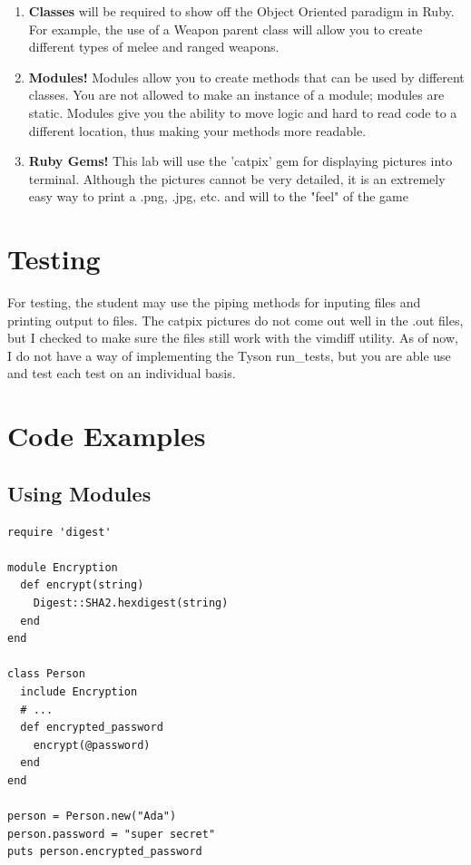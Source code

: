 \documentclass{article}
\begin{document}
\begin{enumerate}

\item \textbf{Classes} will be required to show off the Object Oriented paradigm in Ruby. For example, the use of a Weapon parent class will allow you to create different types of melee and ranged weapons. 

\item \textbf{Modules!} Modules allow you to create methods that can be used by different classes. You are not allowed to make an instance of a module; modules are static. Modules give you the ability to move logic and hard to read code to a different location, thus making your methods more readable.

\item \textbf{Ruby Gems!} This lab will use the 'catpix' gem for displaying pictures into terminal. Although the pictures cannot be very detailed, it is an extremely easy way to print a .png, .jpg, etc. and will to the "feel" of the game

\end{enumerate}
\newpage

\section*{Testing} 
For testing, the student may use the piping methods for inputing files and printing output to files. The catpix pictures do not come out well in the .out files, but I checked to make sure the files still work with the vimdiff utility. As of now, I do not have a way of implementing the Tyson run\_tests, but you are able use and test each test on an individual basis.

\section*{Code Examples } 

\subsection*{Using Modules \cite{code:beginners}}
\begin{lstlisting}
require 'digest'

module Encryption
  def encrypt(string)
    Digest::SHA2.hexdigest(string)
  end
end

class Person
  include Encryption
  # ...
  def encrypted_password
    encrypt(@password)
  end
end

person = Person.new("Ada")
person.password = "super secret"
puts person.encrypted_password
\end{lstlisting}
\end{document}
